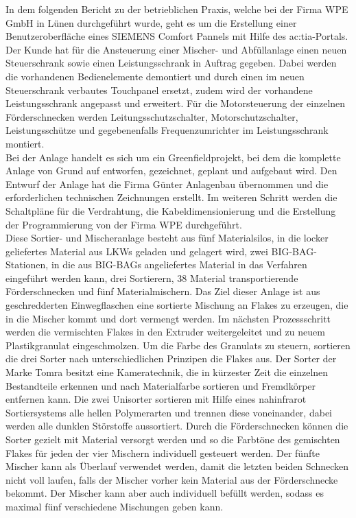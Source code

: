 In dem folgenden Bericht zu der betrieblichen Praxis, welche bei der Firma WPE GmbH in Lünen durchgeführt wurde, geht es um die Erstellung einer Benutzeroberfläche eines SIEMENS Comfort Pannels mit Hilfe des \gls{ac:tia}-Portals. \\
Der Kunde hat für die Ansteuerung einer Mischer- und Abfüllanlage einen neuen Steuerschrank sowie einen Leistungsschrank in Auftrag gegeben. Dabei werden die vorhandenen Bedienelemente demontiert und durch einen im neuen Steuerschrank verbautes Touchpanel ersetzt, zudem wird der vorhandene Leistungsschrank angepasst und erweitert. Für die Motorsteuerung der einzelnen Förderschnecken werden Leitungsschutzschalter, Motorschutzschalter, Leistungsschütze und gegebenenfalls Frequenzumrichter im Leistungsschrank montiert.\\ 
Bei der Anlage handelt es sich um ein Greenfieldprojekt, bei dem die komplette Anlage von Grund auf entworfen, gezeichnet, geplant und aufgebaut wird. Den Entwurf der Anlage hat die Firma Günter Anlagenbau übernommen und die erforderlichen technischen Zeichnungen erstellt. Im weiteren Schritt werden die Schaltpläne für die Verdrahtung, die Kabeldimensionierung und die Erstellung der Programmierung von der Firma WPE durchgeführt.\\
Diese Sortier- und Mischeranlage besteht aus fünf Materialsilos, in die locker geliefertes Material aus LKWs geladen und gelagert wird, zwei BIG-BAG-Stationen, in die aus BIG-BAGs angeliefertes Material in das Verfahren eingeführt werden kann, drei Sortierern, 38 Material transportierende Förderschnecken und fünf Materialmischern. Das Ziel dieser Anlage ist aus geschredderten Einwegflaschen eine sortierte Mischung an Flakes zu erzeugen, die in die Mischer kommt und dort vermengt werden. Im nächsten Prozessschritt werden die vermischten Flakes in den Extruder weitergeleitet und zu neuem Plastikgranulat eingeschmolzen. Um die Farbe des Granulats zu steuern, sortieren die drei Sorter nach unterschiedlichen Prinzipen die Flakes aus. Der Sorter der Marke Tomra besitzt eine Kameratechnik, die in kürzester Zeit die einzelnen Bestandteile erkennen und nach Materialfarbe sortieren und Fremdkörper entfernen kann. Die zwei Unisorter sortieren mit Hilfe eines nahinfrarot Sortiersystems alle hellen Polymerarten und trennen diese  voneinander, dabei werden alle dunklen Störstoffe aussortiert. Durch die Förderschnecken können die Sorter gezielt mit Material versorgt werden und so die Farbtöne des gemischten Flakes für jeden der vier Mischern individuell gesteuert werden. Der fünfte Mischer kann als Überlauf verwendet werden, damit die letzten beiden Schnecken nicht voll laufen, falls der Mischer vorher kein Material aus der Förderschnecke bekommt. Der Mischer kann aber auch individuell befüllt werden, sodass es maximal fünf verschiedene Mischungen geben kann.\\
